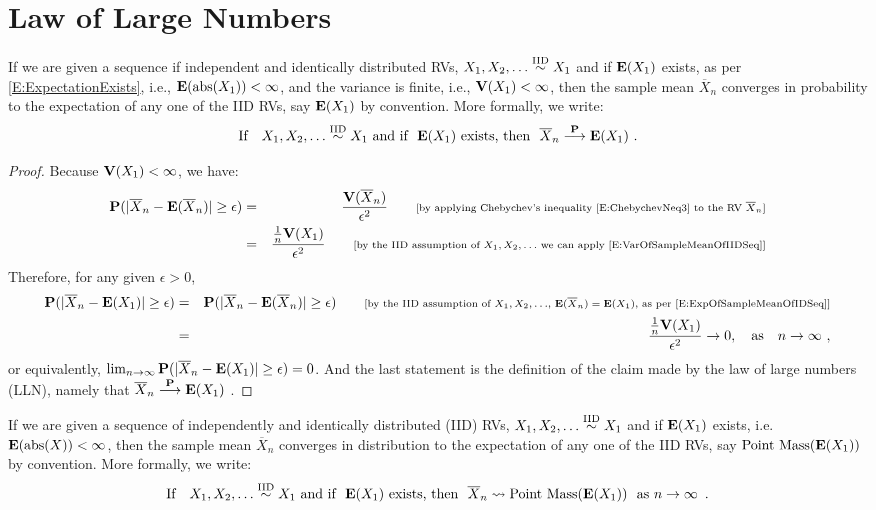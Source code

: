\section{Law of Large Numbers}

\begin{prop}
If we are given a sequence if independent and identically distributed RVs, $X_1,X_2,\ldots \overset{{\rm IID}}{\sim} X_1$ and if $\mathbf{E}(X_1)$ exists, as per \eqref{E:ExpectationExists}, i.e., $\mathbf{E}(\operatorname{abs}(X_1))< \infty$, and the variance is finite, i.e., $\mathbf{V}(X_1) < \infty$, then the sample mean $\overline{X}_n$ converges in probability to the expectation of any one of the IID RVs, say $\mathbf{E}(X_1)$ by convention.  More formally, we write:
\[
\text{If} \quad X_1,X_2,\ldots \overset{\IID}{\sim} X_1 \ \text{and if } \ \e(X_1) \ \text{exists, then } \ \overline{X}_n \overset{\p}{\longrightarrow} \e(X_1) \ .
\]
{\normalsize
\begin{proof}
Because $\mathbf{V}(X_1) < \infty$, we have:
\begin{eqnarray}
\mathbf{P}(| \overline{X}_n - \mathbf{E}(\overline{X}_n) | \geq \epsilon)
&=& \frac{\mathbf{V}(\overline{X}_n)}{\epsilon^2} \qquad \text{{\scriptsize [by applying Chebychev's inequality \eqref{E:ChebychevNeq3} to the RV $\overline{X}_n$]}} \notag \\
&=& \frac{\frac{1}{n}\mathbf{V}(X_1)}{\epsilon^2} \qquad \text{{\scriptsize [by the IID assumption of $X_1,X_2,\ldots$ we can apply \eqref{E:VarOfSampleMeanOfIIDSeq}]}} \notag 
\end{eqnarray}
Therefore, for any given $\epsilon>0$,
\begin{eqnarray}
\mathbf{P}(| \overline{X}_n - \mathbf{E}(X_1) | \geq \epsilon)
&=&  \mathbf{P}(| \overline{X}_n - \mathbf{E}(\overline{X}_n) | \geq \epsilon) \qquad \text{{\scriptsize [by the IID assumption of $X_1,X_2,\ldots$,  $\mathbf{E}(\overline{X}_n)=\mathbf{E}(X_1)$, as per \eqref{E:ExpOfSampleMeanOfIDSeq}]}} \notag \\
&=&  \frac{\frac{1}{n}\mathbf{V}(X_1)}{\epsilon^2} \to 0, \quad \text{as} \quad n \to \infty \ , \notag
\end{eqnarray}
or equivalently, $\lim_{n \to \infty} \mathbf{P}(| \overline{X}_n - \mathbf{E}(X_1) | \geq \epsilon) = 0$.  And the last statement is the definition of the claim made by the law of large numbers (LLN), namely that $\overline{X}_n \overset{\mathbf{P}}{\longrightarrow} \mathbf{E}(X_1)$ .
\end{proof}
}

\begin{prop}
If we are given a sequence of independently and identically distributed (IID) RVs, $X_1,X_2,\ldots \overset{{\rm IID}}{\sim} X_1$ and if $\mathbf{E}(X_1)$ exists, i.e.~$\mathbf{E}(\operatorname{abs}(X)) < \infty$, then the sample mean $\overline{X}_n$ converges in distribution to the expectation of any one of the IID RVs, say $\mbox{{\rm Point~Mass}}(\mathbf{E}(X_1))$ by convention.  More formally, we write:
\[
\text{If} \quad X_1,X_2,\ldots \overset{{\rm IID}}{\sim} X_1 \ \text{and if } \ \mathbf{E}(X_1) \ \text{exists, then } \ \overline{X}_n \rightsquigarrow \mbox{{\rm Point~Mass}}(\mathbf{E}(X_1)) \ \text{ as } n\to\infty \enspace .
\]
\end{prop}


\end{prop}
